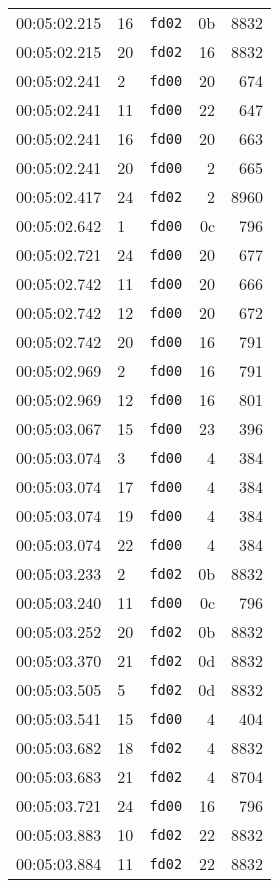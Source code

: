 \documentclass{article}
\begin{document}
\begin{longtable}{lllrr}
00:05:02.215 & 16 & \texttt{fd02} & 0b & 8832 \\
00:05:02.215 & 20 & \texttt{fd02} & 16 & 8832 \\
00:05:02.241 & 2 & \texttt{fd00} & 20 & 674 \\
00:05:02.241 & 11 & \texttt{fd00} & 22 & 647 \\
00:05:02.241 & 16 & \texttt{fd00} & 20 & 663 \\
00:05:02.241 & 20 & \texttt{fd00} & 2 & 665 \\
00:05:02.417 & 24 & \texttt{fd02} & 2 & 8960 \\
00:05:02.642 & 1 & \texttt{fd00} & 0c & 796 \\
00:05:02.721 & 24 & \texttt{fd00} & 20 & 677 \\
00:05:02.742 & 11 & \texttt{fd00} & 20 & 666 \\
00:05:02.742 & 12 & \texttt{fd00} & 20 & 672 \\
00:05:02.742 & 20 & \texttt{fd00} & 16 & 791 \\
00:05:02.969 & 2 & \texttt{fd00} & 16 & 791 \\
00:05:02.969 & 12 & \texttt{fd00} & 16 & 801 \\
00:05:03.067 & 15 & \texttt{fd00} & 23 & 396 \\
00:05:03.074 & 3 & \texttt{fd00} & 4 & 384 \\
00:05:03.074 & 17 & \texttt{fd00} & 4 & 384 \\
00:05:03.074 & 19 & \texttt{fd00} & 4 & 384 \\
00:05:03.074 & 22 & \texttt{fd00} & 4 & 384 \\
00:05:03.233 & 2 & \texttt{fd02} & 0b & 8832 \\
00:05:03.240 & 11 & \texttt{fd00} & 0c & 796 \\
00:05:03.252 & 20 & \texttt{fd02} & 0b & 8832 \\
00:05:03.370 & 21 & \texttt{fd02} & 0d & 8832 \\
00:05:03.505 & 5 & \texttt{fd02} & 0d & 8832 \\
00:05:03.541 & 15 & \texttt{fd00} & 4 & 404 \\
00:05:03.682 & 18 & \texttt{fd02} & 4 & 8832 \\
00:05:03.683 & 21 & \texttt{fd02} & 4 & 8704 \\
00:05:03.721 & 24 & \texttt{fd00} & 16 & 796 \\
00:05:03.883 & 10 & \texttt{fd02} & 22 & 8832 \\
00:05:03.884 & 11 & \texttt{fd02} & 22 & 8832 \\

\end{longtable}
\end{document}

